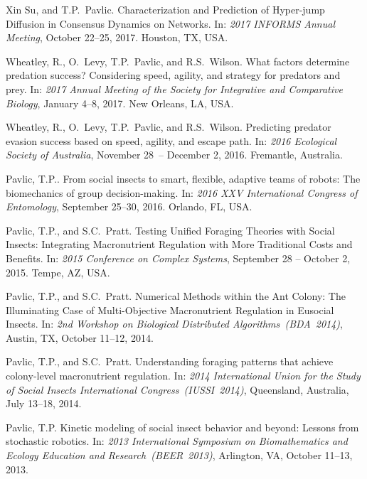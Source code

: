 \documentclass[10pt]{article}           %
\begin{document}
\begin{bibenum}
    \item Xin Su, and T.P.~Pavlic. Characterization and Prediction of
        Hyper-jump Diffusion in Consensus Dynamics on Networks. In:
        \emph{2017 INFORMS Annual Meeting}, October 22--25, 2017.
        Houston, TX, USA.

    \item Wheatley, R., O.~Levy, T.P.~Pavlic, and R.S.~Wilson. What
        factors determine predation success? Considering speed, agility,
        and strategy for predators and prey. In: \emph{2017
        Annual Meeting of the Society for Integrative and Comparative
        Biology}, January 4--8, 2017. New Orleans, LA, USA.

    \item Wheatley, R., O.~Levy, T.P.~Pavlic, and R.S.~Wilson.
        Predicting predator evasion success based on speed, agility, and
        escape path. In: \emph{2016 Ecological Society of Australia},
        November 28~-- December 2, 2016. Fremantle, Australia.

    \item Pavlic, T.P.. From social insects to smart, flexible, adaptive
        teams of robots: The biomechanics of group decision-making. In:
        \emph{2016 XXV International Congress of Entomology}, September
        25--30, 2016. Orlando, FL, USA.

    \item Pavlic, T.P., and S.C.~Pratt. Testing Unified Foraging
        Theories with Social Insects: Integrating Macronutrient
        Regulation with More Traditional Costs and Benefits. In:
        \emph{2015 Conference on Complex Systems}, September 28 –
        October 2, 2015. Tempe, AZ, USA.

    \item Pavlic, T.P., and S.C.~Pratt.
        Numerical Methods within the Ant Colony: The Illuminating Case
        of Multi-Objective Macronutrient Regulation in Eusocial Insects.
        In: \emph{2nd Workshop on Biological Distributed
        Algorithms~(BDA~2014)}, Austin, TX, October 11--12, 2014.

    \item Pavlic, T.P., and S.C.~Pratt. Understanding foraging patterns
        that achieve colony-level macronutrient regulation. In:
        \emph{2014 International Union for the Study of Social Insects
        International Congress~(IUSSI~2014)}, Queensland, Australia,
        July 13--18, 2014.

    \item Pavlic, T.P.
        Kinetic modeling of social insect behavior and beyond: Lessons
        from stochastic robotics. In: \emph{2013 International Symposium
        on Biomathematics and Ecology Education and
        Research~(BEER~2013)}, Arlington, VA, October 11--13, 2013.


\end{bibenum}
\end{document}
